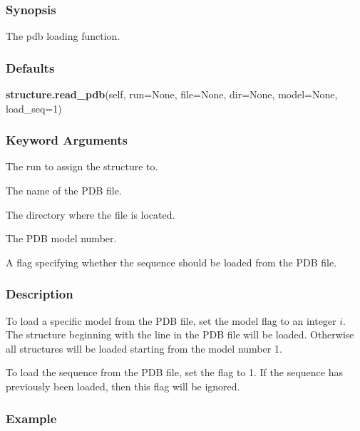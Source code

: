   
 \subsubsection{Synopsis} 

 The pdb loading function. 
  

  
 \subsubsection{Defaults} 

 \textsf{\textbf{structure.read\_pdb}(self, run=None, file=None, dir=None, model=None, load\_seq=1)} 

  
 \subsubsection{Keyword Arguments} 

   The run to assign the structure to.   

   The name of the PDB file.   

   The directory where the file is located.   

   The PDB model number.   

   A flag specifying whether the sequence should be loaded from the PDB file.  

  

  
 \subsubsection{Description} 

 To load a specific model from the PDB file, set the model flag to an integer $i$.  The structure beginning with the line  in the PDB file will be loaded.  Otherwise all structures will be loaded starting from the model number 1. 
  

 To load the sequence from the PDB file, set the  flag to 1.  If the sequence has previously been loaded, then this flag will be ignored. 
  

  
 \subsubsection{Example} 

